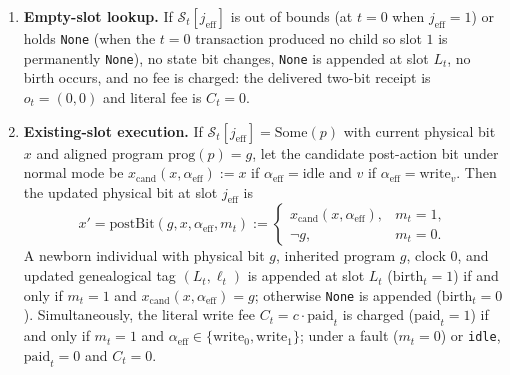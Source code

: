 \documentclass[11pt,letterpaper]{article}
\providecommand{\tightlist}{\setlength{\itemsep}{2pt}\setlength{\parskip}{0pt}}
\begin{document}
\begin{enumerate}
\def\labelenumi{\arabic{enumi}.}
\tightlist
\item
  \textbf{Empty-slot lookup.} If \(\mathcal{S}_t[j_{\mathrm{eff}}]\) is
  out of bounds (at \(t = 0\) when \(j_{\mathrm{eff}} = 1\)) or holds
  \texttt{None} (when the \(t=0\) transaction produced no child so slot
  \(1\) is permanently \texttt{None}), no state bit changes,
  \texttt{None} is appended at slot \(L_t\), no birth occurs, and no fee
  is charged: the delivered two-bit receipt is \(o_t = (0, 0)\) and
  literal fee is \(C_t = 0\).
\item
  \textbf{Existing-slot execution.} If
  \(\mathcal{S}_t[j_{\mathrm{eff}}] = \mathrm{Some}(p)\) with current
  physical bit \(x\) and aligned program \(\mathrm{prog}(p) = g\), let
  the candidate post-action bit under normal mode be
  \(x_{\mathrm{cand}}(x, \alpha_{\mathrm{eff}}) := x\) if
  \(\alpha_{\mathrm{eff}} = \mathrm{idle}\) and \(v\) if
  \(\alpha_{\mathrm{eff}} = \mathrm{write}_v\). Then the updated
  physical bit at slot \(j_{\mathrm{eff}}\) is
  \[x' = \mathrm{postBit}(g, x, \alpha_{\mathrm{eff}}, m_t) := \begin{cases} x_{\mathrm{cand}}(x, \alpha_{\mathrm{eff}}), & m_t = 1, \\ \neg g, & m_t = 0. \end{cases}\]
  A newborn individual with physical bit \(g\), inherited program \(g\),
  clock \(0\), and updated genealogical tag \((L_t, \ell_t)\) is
  appended at slot \(L_t\) (\(\mathrm{birth}_t = 1\)) if and only if
  \(m_t = 1\) and \(x_{\mathrm{cand}}(x, \alpha_{\mathrm{eff}}) = g\);
  otherwise \texttt{None} is appended (\(\mathrm{birth}_t = 0\)).
  Simultaneously, the literal write fee
  \(C_t = c \cdot \mathrm{paid}_t\) is charged (\(\mathrm{paid}_t = 1\))
  if and only if \(m_t = 1\) and
  \(\alpha_{\mathrm{eff}} \in \{\mathrm{write}_0, \mathrm{write}_1\}\);
  under a fault (\(m_t = 0\)) or \texttt{idle}, \(\mathrm{paid}_t = 0\)
  and \(C_t = 0\).
\end{enumerate}
\end{document}
